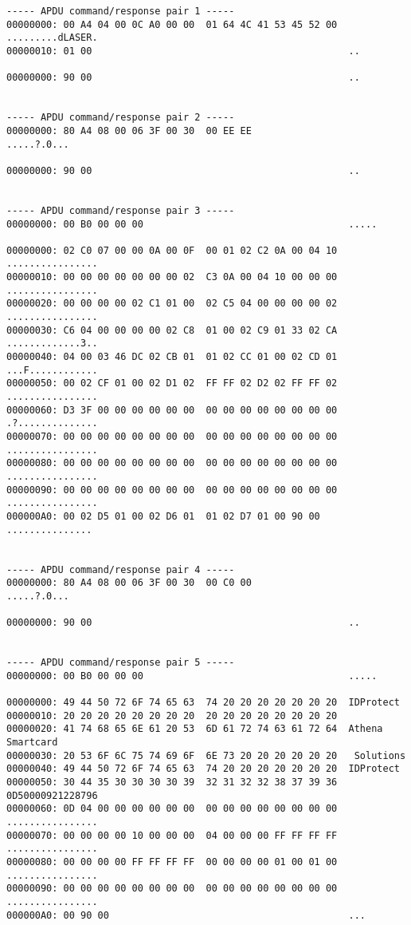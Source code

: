 \documentclass[bsc,frontabs,twoside,singlespacing,parskip,deptreport]{infthesis}     %
\begin{document}
\begin{verbatim}
----- APDU command/response pair 1 -----
00000000: 00 A4 04 00 0C A0 00 00  01 64 4C 41 53 45 52 00  .........dLASER.
00000010: 01 00                                             ..

00000000: 90 00                                             ..


----- APDU command/response pair 2 -----
00000000: 80 A4 08 00 06 3F 00 30  00 EE EE                 .....?.0...

00000000: 90 00                                             ..


----- APDU command/response pair 3 -----
00000000: 00 B0 00 00 00                                    .....

00000000: 02 C0 07 00 00 0A 00 0F  00 01 02 C2 0A 00 04 10  ................
00000010: 00 00 00 00 00 00 00 02  C3 0A 00 04 10 00 00 00  ................
00000020: 00 00 00 00 02 C1 01 00  02 C5 04 00 00 00 00 02  ................
00000030: C6 04 00 00 00 00 02 C8  01 00 02 C9 01 33 02 CA  .............3..
00000040: 04 00 03 46 DC 02 CB 01  01 02 CC 01 00 02 CD 01  ...F............
00000050: 00 02 CF 01 00 02 D1 02  FF FF 02 D2 02 FF FF 02  ................
00000060: D3 3F 00 00 00 00 00 00  00 00 00 00 00 00 00 00  .?..............
00000070: 00 00 00 00 00 00 00 00  00 00 00 00 00 00 00 00  ................
00000080: 00 00 00 00 00 00 00 00  00 00 00 00 00 00 00 00  ................
00000090: 00 00 00 00 00 00 00 00  00 00 00 00 00 00 00 00  ................
000000A0: 00 02 D5 01 00 02 D6 01  01 02 D7 01 00 90 00     ...............


----- APDU command/response pair 4 -----
00000000: 80 A4 08 00 06 3F 00 30  00 C0 00                 .....?.0...

00000000: 90 00                                             ..


----- APDU command/response pair 5 -----
00000000: 00 B0 00 00 00                                    .....

00000000: 49 44 50 72 6F 74 65 63  74 20 20 20 20 20 20 20  IDProtect       
00000010: 20 20 20 20 20 20 20 20  20 20 20 20 20 20 20 20                  
00000020: 41 74 68 65 6E 61 20 53  6D 61 72 74 63 61 72 64  Athena Smartcard
00000030: 20 53 6F 6C 75 74 69 6F  6E 73 20 20 20 20 20 20   Solutions      
00000040: 49 44 50 72 6F 74 65 63  74 20 20 20 20 20 20 20  IDProtect       
00000050: 30 44 35 30 30 30 30 39  32 31 32 32 38 37 39 36  0D50000921228796
00000060: 0D 04 00 00 00 00 00 00  00 00 00 00 00 00 00 00  ................
00000070: 00 00 00 00 10 00 00 00  04 00 00 00 FF FF FF FF  ................
00000080: 00 00 00 00 FF FF FF FF  00 00 00 00 01 00 01 00  ................
00000090: 00 00 00 00 00 00 00 00  00 00 00 00 00 00 00 00  ................
000000A0: 00 90 00                                          ...



\end{verbatim}
\end{document}
